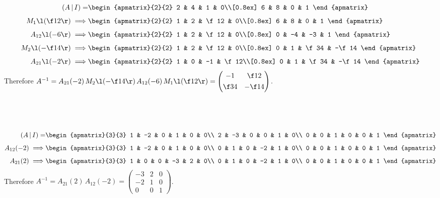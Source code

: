 \documentclass[a4paper]{article}
\begin{document}
\begin{align*}
(A\,|\,I) = &\begin{apmatrix}{2}{2}
	2 & 4 & 1 & 0\\[0.8ex]
	6 & 8 & 0 & 1
\end{apmatrix}\\[1ex]
M_1\l(\f12\r) \implies &\begin{apmatrix}{2}{2}
	1 & 2 & \f12 & 0\\[0.8ex]
	6 & 8 & 0 & 1
\end{apmatrix}\\[1ex]
A_{12} \l(-6\r) \implies &\begin{apmatrix}{2}{2}
	1 & 2 & \f12 & 0\\[0.8ex]
	0 & -4 & -3 & 1
\end{apmatrix}\\[1ex]
M_2 \l(-\f14\r) \implies &\begin{apmatrix}{2}{2}
	1 & 2 & \f12 & 0\\[0.8ex]
	0 & 1 & \f34 & -\f14
\end{apmatrix}\\[1ex]
A_{21} \l(-2\r) \implies &\begin{apmatrix}{2}{2}
	1 & 0 & -1 & \f12\\[0.8ex]
	0 & 1 & \f34 & -\f14
\end{apmatrix}
\end{align*}
Therefore $A^{-1} = A_{21}(-2)\, M_2\l(-\f14\r)\, A_{12}(-6)\, M_1\l(\f12\r) = \begin{pmatrix}-1 & \f12\\[0.8ex] \f34 & -\f14\end{pmatrix}$.

\subsection{~}

\begin{align*}
(A\,|\,I) = &\begin{apmatrix}{3}{3}
	1 & -2 & 0 & 1 & 0 & 0\\
	2 & -3 & 0 & 0 & 1 & 0\\
	0 & 0 & 1 & 0 & 0 & 1
\end{apmatrix}\\[1ex]
A_{12}(-2) \implies &\begin{apmatrix}{3}{3}
	1 & -2 & 0 & 1 & 0 & 0\\
	0 & 1 & 0 & -2 & 1 & 0\\
	0 & 0 & 1 & 0 & 0 & 1
\end{apmatrix}\\[1ex]
A_{21}(2) \implies &\begin{apmatrix}{3}{3}
	1 & 0 & 0 & -3 & 2 & 0\\
	0 & 1 & 0 & -2 & 1 & 0\\
	0 & 0 & 1 & 0 & 0 & 1
\end{apmatrix}
\end{align*}
Therefore $A^{-1} = A_{21}(2)\, A_{12}(-2) = \begin{pmatrix}-3 & 2 & 0\\ -2 & 1 & 0\\ 0 & 0 & 1\end{pmatrix}$.
\end{document}

